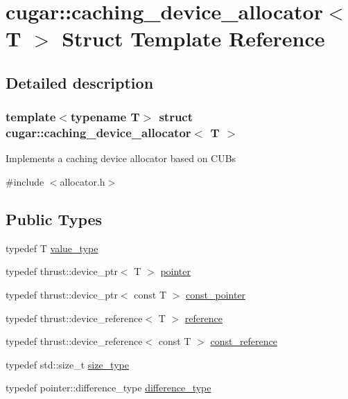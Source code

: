 \hypertarget{structcugar_1_1caching__device__allocator}{}\section{cugar\+:\+:caching\+\_\+device\+\_\+allocator$<$ T $>$ Struct Template Reference}
\label{structcugar_1_1caching__device__allocator}


\subsection{Detailed description}
\subsubsection*{template$<$typename T$>$\newline
struct cugar\+::caching\+\_\+device\+\_\+allocator$<$ T $>$}

Implements a caching device allocator based on C\+UB\textquotesingle{}s 

{\ttfamily \#include $<$allocator.\+h$>$}

\subsection*{Public Types}
\begin{DoxyCompactItemize}
\item 
typedef T \hyperlink{structcugar_1_1caching__device__allocator_a4a03f6a7fcb58701170e501e562bf885}{value\+\_\+type}
\item 
typedef thrust\+::device\+\_\+ptr$<$ T $>$ \hyperlink{structcugar_1_1caching__device__allocator_a442ab01357a3851bb0e9f17c5e49fce3}{pointer}
\item 
typedef thrust\+::device\+\_\+ptr$<$ const T $>$ \hyperlink{structcugar_1_1caching__device__allocator_a56ae6e43547f283ab330befe1643e3dd}{const\+\_\+pointer}
\item 
typedef thrust\+::device\+\_\+reference$<$ T $>$ \hyperlink{structcugar_1_1caching__device__allocator_a13eca6cad4c022bd791efb73d64adb8a}{reference}
\item 
typedef thrust\+::device\+\_\+reference$<$ const T $>$ \hyperlink{structcugar_1_1caching__device__allocator_a1c9ffc95bc3d45eb753113428c362aa6}{const\+\_\+reference}
\item 
typedef std\+::size\+\_\+t \hyperlink{structcugar_1_1caching__device__allocator_a6ac404077fed53edacca4e62b15fdbe9}{size\+\_\+type}
\item 
typedef pointer\+::difference\+\_\+type \hyperlink{structcugar_1_1caching__device__allocator_ae3b6337c894bc9a1bb8bf056593ceb4e}{difference\+\_\+type}
\end{DoxyCompactItemize}
